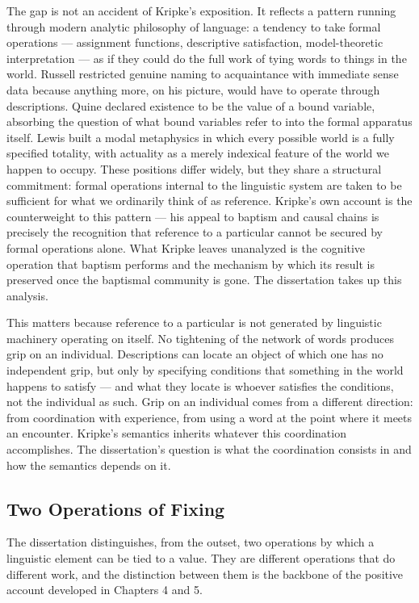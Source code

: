 \documentclass[10pt]{article}
\begin{document}
The gap is not an accident of Kripke's exposition. It reflects a pattern running through modern analytic philosophy of language: a tendency to take formal operations --- assignment functions, descriptive satisfaction, model-theoretic interpretation --- as if they could do the full work of tying words to things in the world. Russell restricted genuine naming to acquaintance with immediate sense data because anything more, on his picture, would have to operate through descriptions. Quine declared existence to be the value of a bound variable, absorbing the question of what bound variables refer to into the formal apparatus itself. Lewis built a modal metaphysics in which every possible world is a fully specified totality, with actuality as a merely indexical feature of the world we happen to occupy. These positions differ widely, but they share a structural commitment: formal operations internal to the linguistic system are taken to be sufficient for what we ordinarily think of as reference. Kripke's own account is the counterweight to this pattern --- his appeal to baptism and causal chains is precisely the recognition that reference to a particular cannot be secured by formal operations alone. What Kripke leaves unanalyzed is the cognitive operation that baptism performs and the mechanism by which its result is preserved once the baptismal community is gone. The dissertation takes up this analysis.

This matters because reference to a particular is not generated by linguistic machinery operating on itself. No tightening of the network of words produces grip on an individual. Descriptions can locate an object of which one has no independent grip, but only by specifying conditions that something in the world happens to satisfy --- and what they locate is whoever satisfies the conditions, not the individual as such. Grip on an individual comes from a different direction: from coordination with experience, from using a word at the point where it meets an encounter. Kripke's semantics inherits whatever this coordination accomplishes. The dissertation's question is what the coordination consists in and how the semantics depends on it.

\subsection{Two Operations of Fixing}\label{two-operations-of-fixing}

The dissertation distinguishes, from the outset, two operations by which a linguistic element can be tied to a value. They are different operations that do different work, and the distinction between them is the backbone of the positive account developed in Chapters 4 and 5.
\end{document}
